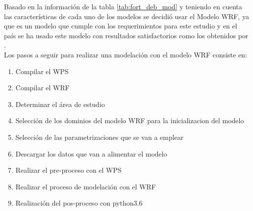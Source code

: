 Basado en la información de la tabla \ref{tab:fort_deb_mod} y teniendo en cuenta las características de cada uno de los modelos se decidió usar el Modelo WRF, ya que es un modelo que cumple con los requerimientos para este estudio y en el país se ha usado este modelo con resultados satisfactorios como los obtenidos por \citep{Mejia2012,Arango2011,Arango2014,Ruiz2014,Uribe2012,RojasA2011,ArmentaPorras2013}.\\

Los pasos a seguir para realizar una modelación con el modelo WRF consiste en:
\begin{enumerate}
\item Compilar el WPS
\item Compilar el WRF
\item Determinar el área de estudio
\item Selección de los dominios del modelo WRF para la inicializacion del modelo
\item Selección de las parametrizaciones que se van a emplear
\item Descargar los datos que van a alimentar el modelo
\item Realizar el pre-proceso con el WPS
\item Realizar el proceso de modelación con el WRF
\item Realización del pos-proceso con python3.6


\end{enumerate}






